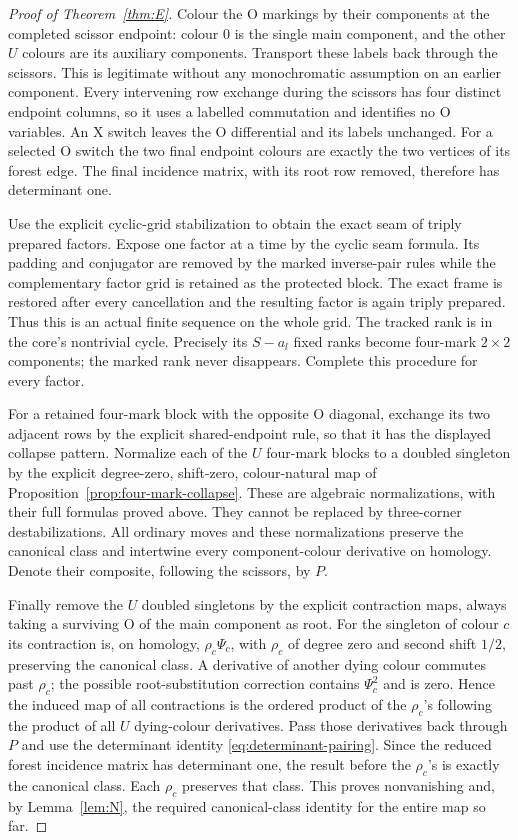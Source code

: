 \documentclass[11pt,a4paper]{article}
\theoremstyle{remark}
\begin{document}
\begin{proof}[Proof of Theorem~\ref{thm:E}]
Colour the O markings by their components at the completed scissor
endpoint: colour $0$ is the single main component, and the other
$U$ colours are its auxiliary components.  Transport these labels
back through the scissors.  This is legitimate without any
monochromatic assumption on an earlier component.  Every intervening
row exchange during the scissors has four distinct endpoint columns,
so it uses a labelled commutation and identifies no O variables.
An X switch leaves the O differential and its labels unchanged.
For a selected O switch the two final endpoint colours are exactly
the two vertices of its forest edge.  The final incidence matrix,
with its root row removed, therefore has determinant one.

Use the explicit cyclic-grid stabilization to obtain the exact seam
of triply prepared factors.  Expose one factor at a time by the
cyclic seam formula.  Its padding and conjugator are removed by the
marked inverse-pair rules while the complementary factor grid is
retained as the protected block.  The exact frame is restored after
every cancellation and the resulting factor is again triply
prepared.  Thus this is an actual finite sequence on the whole grid.
The tracked rank is in the core's nontrivial cycle.  Precisely its
$S-a_l$ fixed ranks become four-mark $2\times2$ components; the marked
rank never disappears.  Complete this procedure for every factor.

For a retained four-mark block with the opposite O diagonal, exchange
its two adjacent rows by the explicit shared-endpoint rule, so that
it has the displayed collapse pattern.  Normalize each of the $U$
four-mark blocks to a doubled singleton by
the explicit degree-zero, shift-zero, colour-natural map of
Proposition~\ref{prop:four-mark-collapse}.  These are algebraic
normalizations, with their full formulas proved above.  They cannot
be replaced by three-corner destabilizations.  All ordinary moves
and these normalizations preserve the canonical class and intertwine
every component-colour derivative on homology.  Denote their
composite, following the scissors, by $P$.

Finally remove the $U$ doubled singletons by the explicit contraction
maps, always taking a surviving O of the main component as root.
For the singleton of colour $c$ its contraction is, on homology,
$\rho_c\Psi_c$, with $\rho_c$ of degree zero and second shift $1/2$,
preserving the canonical class.  A derivative of another dying
colour commutes past $\rho_c$; the possible root-substitution
correction contains $\Psi_c^2$ and is zero.  Hence the induced map of
all contractions is the ordered product of the $\rho_c$'s following
the product of all $U$ dying-colour derivatives.  Pass those
derivatives back through $P$ and use the determinant identity
\eqref{eq:determinant-pairing}.  Since the reduced forest incidence
matrix has determinant one, the result before the $\rho_c$'s is
exactly the canonical class.  Each $\rho_c$ preserves that class.
This proves nonvanishing and, by Lemma~\ref{lem:N}, the required
canonical-class identity for the entire map so far.


\end{proof}
\end{document}
